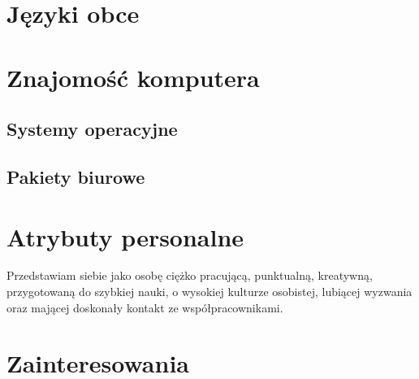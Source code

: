 \documentclass[12pt,a4paper]{moderncv}
\begin{document}
\section{Języki obce}

\section{Znajomość komputera}

\subsection{Systemy operacyjne}

\subsection{Pakiety biurowe}

\section{Atrybuty personalne}
Przedstawiam siebie jako osobę ciężko pracującą, punktualną, kreatywną, przygotowaną do szybkiej nauki, o wysokiej kulturze osobistej, lubiącej wyzwania oraz mającej doskonały kontakt ze współpracownikami.

\section{Zainteresowania}

\renewcommand{\listitemsymbol}{} %
\end{document}
